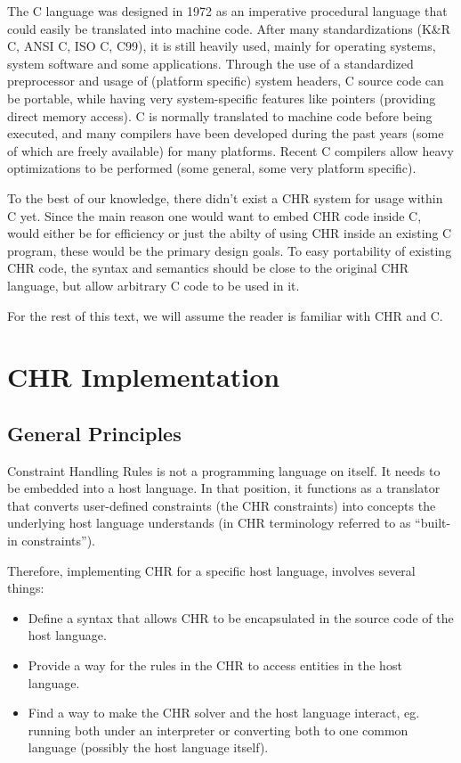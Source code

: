 \documentclass{llncs}
\begin{document}
The C language was designed in 1972 as an imperative procedural language that
could easily be translated into machine code. After many standardizations (K\&R C,
ANSI C, ISO C, C99), it is still heavily used, mainly for operating systems,
system software and some applications. Through the use of a standardized preprocessor
and usage of (platform specific) system headers, C source code can be portable,
while having very system-specific features like pointers (providing direct memory access).
C is normally translated to machine code before being executed, and many compilers
have been developed during the past years (some of which are freely available) for
many platforms. Recent C compilers allow heavy optimizations to be performed (some
general, some very platform specific).

To the best of our knowledge, there didn't exist a CHR system for usage within C
yet. Since the main reason one would want to embed CHR code inside C, would either
be for efficiency or just the abilty of using CHR inside an existing C program,
these would be the primary design goals. To easy portability of existing CHR
code, the syntax and semantics should be close to the original CHR language, but
allow arbitrary C code to be used in it.

For the rest of this text, we will assume the reader is familiar with CHR and C.

\section{CHR Implementation}

\subsection{General Principles}

Constraint Handling Rules is not a programming language on itself. It needs to be embedded
into a host language. In that position, it functions as a translator that converts
user-defined constraints (the CHR constraints) into concepts the underlying host language
understands (in CHR terminology referred to as ``built-in constraints'').

Therefore, implementing CHR for a specific host language, involves several things: \begin{itemize}
\item Define a syntax that allows CHR to be encapsulated in the source code of the host language.
\item Provide a way for the rules in the CHR to access entities in the host language.
\item Find a way to make the CHR solver and the host language interact, eg. running both under an interpreter
      or converting both to one common language (possibly the host language itself).
\end{itemize}
\end{document}
